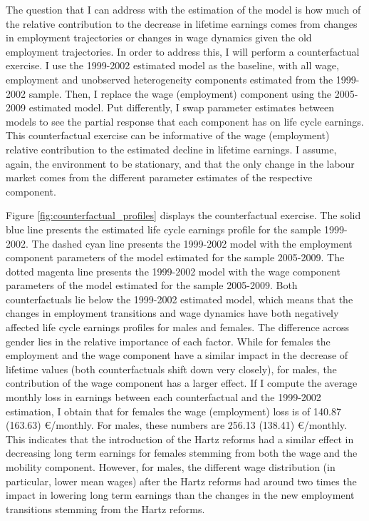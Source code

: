 \documentclass[12pt, a4paper]{article}
\begin{document}
The question that I can address with the estimation of the model is how much of the relative contribution to the decrease in lifetime earnings comes from changes in employment trajectories or changes in wage dynamics given the old employment trajectories. In order to address this, I will perform a counterfactual exercise. I use the 1999-2002 estimated model as the baseline, with all wage, employment and unobserved heterogeneity components estimated from the 1999-2002 sample. Then, I replace the wage (employment) component using the 2005-2009 estimated model. Put differently, I swap parameter estimates between models to see the partial response that each component has on life cycle earnings. This counterfactual exercise can be informative of the wage (employment) relative contribution to the estimated decline in lifetime earnings. I assume, again, the environment to be stationary, and that the only change in the labour market comes from the different parameter estimates of the respective component.


Figure \ref{fig:counterfactual_profiles} displays the counterfactual exercise. The solid blue line presents the estimated life cycle earnings profile for the sample 1999-2002. The dashed cyan line presents the 1999-2002 model with the employment component parameters of the model estimated for the sample 2005-2009. The dotted magenta line presents the 1999-2002 model with the wage component parameters of the model estimated for the sample 2005-2009. Both counterfactuals lie below the 1999-2002 estimated model, which means that the changes in employment transitions and wage dynamics have both negatively affected life cycle earnings profiles for males and females. The difference across gender lies in the relative importance of each factor. While for females the employment and the wage component have a similar impact in the decrease of lifetime values (both counterfactuals shift down very closely), for males, the contribution of the wage component has a larger effect. If I compute the average monthly loss in earnings between each counterfactual and the 1999-2002 estimation, I obtain that for females the wage (employment) loss is of 140.87 (163.63) \euro/monthly. For males, these numbers are 256.13 (138.41) \euro/monthly. This indicates that the introduction of the Hartz reforms had a similar effect in decreasing long term earnings for females stemming from both the wage and the mobility component. However, for males, the different wage distribution (in particular, lower mean wages) after the Hartz reforms had around two times the impact in lowering long term earnings than the changes in the new employment transitions stemming from the Hartz reforms.
\end{document}
